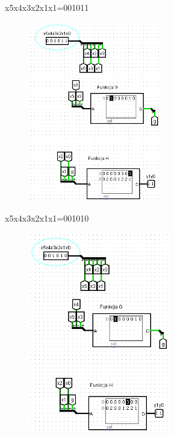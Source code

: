 \documentclass[]{article}
\begin{document}
x5x4x3x2x1x1=001011
\begin{figure}[H]
	\centering
	\includegraphics[width=0.52\textwidth]{1.13.png}
\end{figure}
x5x4x3x2x1x1=001010
\begin{figure}[H]
	\centering
	\includegraphics[width=0.55\textwidth]{1.14.png}
\end{figure}
\end{document}
